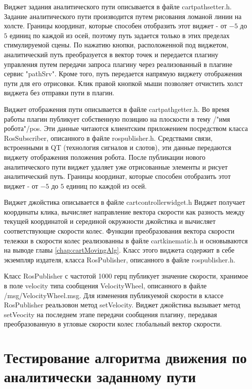 \documentclass[oneside,final,14pt]{extreport}
\begin{document}
Виджет задания аналитического пути описывается в файле cartpathsetter.h. 
Задание аналитического пути производится путем рисования ломаной линии на холсте. Границы координат, которые способен отобразить этот виджет -  от $-5$ до $5$ единиц по каждой из осей, поэтому путь задается только в этих пределах стимулируемой сцены. По нажатию кнопки, расположенной под виджетом, аналитический путь преобразуется в вектор точек и передается плагину управления путем передачи
запроса плагину через реализованный в плагине сервис "pathSrv". 
Кроме того, путь передается напрямую виджету отображения пути для его отрисовки. Клик правой кнопкой мыши позволяет отчистить холст виджета без отправки пути в плагин.

Виджет отображения пути описывается в файле cartpathgetter.h. Во время работы плагин публикует собственную позицию на плоскости в тему /"имя робота"/pos.  Эти данные читаются клиентским приложением посредством класса RosSubscriber, описанного в файле rospublisher.h. Средствами связи, встроенными в QT (технология сигналов и слотов), эти данные передаются виджету отображения положения робота. После публикации нового аналитического пути виджет удаляет уже отрисованные элементы и рисует аналитический путь. Границы координат, которые способен отобразить этот виджет - от $-5$ до $5$ единиц по каждой из осей. 

Виджет джойстика описывается в файле cartcontrollerwidget.h
Виджет получает координаты клика, вычисляет направление вектора скорости как разность между текущей координатой и серединой окружности джойстика  и вычисляет соответствующие скорости колес.  Функции преобразования вектора скорости тележки в скорости колес реализованны в файле cartkinematic.h и основываются на выводе главы \ref{chap:cartMovingAlg}. 
Класс этого виджета содержит в себе экземпляр издателя, класса RosPublisher, описанного в файле rospublisher.h.

 Класс RosPublisher с частотой 1000 герц публикует значение скорости, хранимое в поле velocity типа сообщения VelocityWheel,  описанного в файле /msg/VelocityWheel.msg. Для изменения публикуемой скорости в классе RosPublisher реальзовон метод setVelocity. Виджет джойстика вызывает метод setVeocity на последнем этапе передачи сообщения плагину, передавая преобразованную в угловые скорости колес глобальный вектор скорости.

\section{Тестирование алгоритма движения по аналитически заданному пути}
\end{document}
